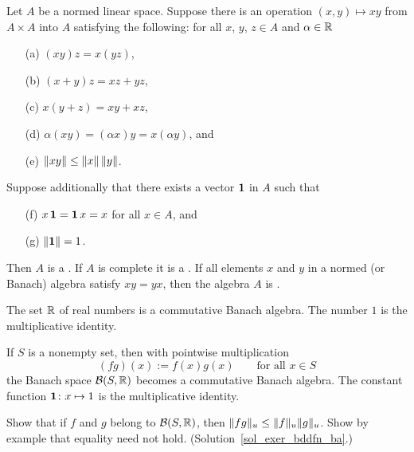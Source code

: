 \begin{defn} Let $A$ be a normed linear space.  Suppose there is an operation $(x,y) \mapsto xy$
from $A \times A$ into $A$ satisfying the following: for all $x$, $y$, $z \in A$ and $\alpha
\in \mathbb{R}$
 \begin{enumerate}
  \item[(a)] $(xy)z = x(yz)$,
  \item[(b)] $(x+y)z = xz+yz$,
  \item[(c)] $x(y+z) = xy+xz$,
  \item[(d)] $\alpha(xy) = (\alpha x)y = x(\alpha y)$, and
  \item[(e)] $\lVert xy\rVert \le \lVert x\rVert\,\lVert y\rVert$.
 \end{enumerate}
Suppose additionally that there exists a vector $\mathbf{1}$ in $A$ such that
 \begin{enumerate}
  \item[(f)] $x\,\mathbf{1} = \mathbf{1}\,x = x$ for all $x \in A$, and
  \item[(g)] $\lVert\mathbf{1}\rVert = 1$.
 \end{enumerate}
Then $A$ is a
.  If $A$ is complete it is a
.  If all elements $x$ and $y$ in a normed (or Banach) algebra
satisfy $xy = yx$, then the algebra $A$ is
.
\end{defn}

\begin{exam}  The set $\mathbb{R}$ of real numbers is a commutative Banach algebra.  The number $1$
is the multiplicative identity.
\end{exam}

\begin{exam}  If $S$ is a nonempty set, then with pointwise multiplication
  \[ (fg)(x) :=  f(x)g(x) \qquad \text{for all $x \in S$} \]
the Banach space $\mathcal{B}(S,\mathbb{R})$ becomes a commutative Banach algebra.  The constant function
$\mathbf{1} \colon x \mapsto 1$ is the multiplicative identity.
\end{exam}

\begin{exer}\label{exer_bddfn_ba}  Show that if $f$ and $g$ belong to $\mathcal{B}(S,\mathbb{R})$, then
$\lVert fg\rVert_u \le \lVert f\rVert_u\lVert g\rVert_u$.  Show by example that equality need not hold.
(Solution~\ref{sol_exer_bddfn_ba}.)
\end{exer}

